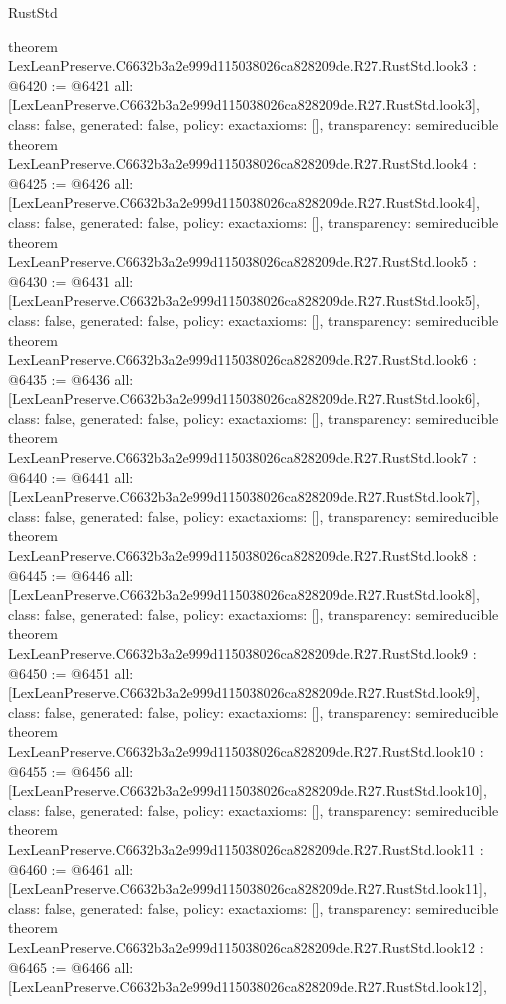 \begin{lexlean}{RustStd}
\begin{coremodule}
{}
theorem LexLeanPreserve.C6632b3a2e999d115038026ca828209de.R27.RustStd.look3 : @6420 := @6421 {
  all: [LexLeanPreserve.C6632b3a2e999d115038026ca828209de.R27.RustStd.look3],
  class: false,
  generated: false,
  policy: exact{axioms: []},
  transparency: semireducible
}
theorem LexLeanPreserve.C6632b3a2e999d115038026ca828209de.R27.RustStd.look4 : @6425 := @6426 {
  all: [LexLeanPreserve.C6632b3a2e999d115038026ca828209de.R27.RustStd.look4],
  class: false,
  generated: false,
  policy: exact{axioms: []},
  transparency: semireducible
}
theorem LexLeanPreserve.C6632b3a2e999d115038026ca828209de.R27.RustStd.look5 : @6430 := @6431 {
  all: [LexLeanPreserve.C6632b3a2e999d115038026ca828209de.R27.RustStd.look5],
  class: false,
  generated: false,
  policy: exact{axioms: []},
  transparency: semireducible
}
theorem LexLeanPreserve.C6632b3a2e999d115038026ca828209de.R27.RustStd.look6 : @6435 := @6436 {
  all: [LexLeanPreserve.C6632b3a2e999d115038026ca828209de.R27.RustStd.look6],
  class: false,
  generated: false,
  policy: exact{axioms: []},
  transparency: semireducible
}
theorem LexLeanPreserve.C6632b3a2e999d115038026ca828209de.R27.RustStd.look7 : @6440 := @6441 {
  all: [LexLeanPreserve.C6632b3a2e999d115038026ca828209de.R27.RustStd.look7],
  class: false,
  generated: false,
  policy: exact{axioms: []},
  transparency: semireducible
}
theorem LexLeanPreserve.C6632b3a2e999d115038026ca828209de.R27.RustStd.look8 : @6445 := @6446 {
  all: [LexLeanPreserve.C6632b3a2e999d115038026ca828209de.R27.RustStd.look8],
  class: false,
  generated: false,
  policy: exact{axioms: []},
  transparency: semireducible
}
theorem LexLeanPreserve.C6632b3a2e999d115038026ca828209de.R27.RustStd.look9 : @6450 := @6451 {
  all: [LexLeanPreserve.C6632b3a2e999d115038026ca828209de.R27.RustStd.look9],
  class: false,
  generated: false,
  policy: exact{axioms: []},
  transparency: semireducible
}
theorem LexLeanPreserve.C6632b3a2e999d115038026ca828209de.R27.RustStd.look10 : @6455 := @6456 {
  all: [LexLeanPreserve.C6632b3a2e999d115038026ca828209de.R27.RustStd.look10],
  class: false,
  generated: false,
  policy: exact{axioms: []},
  transparency: semireducible
}
theorem LexLeanPreserve.C6632b3a2e999d115038026ca828209de.R27.RustStd.look11 : @6460 := @6461 {
  all: [LexLeanPreserve.C6632b3a2e999d115038026ca828209de.R27.RustStd.look11],
  class: false,
  generated: false,
  policy: exact{axioms: []},
  transparency: semireducible
}
theorem LexLeanPreserve.C6632b3a2e999d115038026ca828209de.R27.RustStd.look12 : @6465 := @6466 {
  all: [LexLeanPreserve.C6632b3a2e999d115038026ca828209de.R27.RustStd.look12],
}
\end{coremodule}
\end{lexlean}
